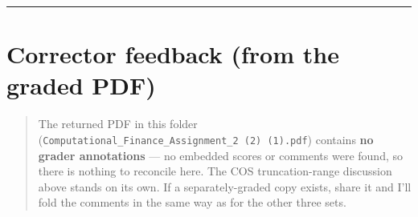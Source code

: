 \documentclass[
  11pt,
]{article}
\begin{document}
\begin{center}\rule{0.5\linewidth}{0.5pt}\end{center}

\hypertarget{corrector-feedback-from-the-graded-pdf}{%
\section{Corrector feedback (from the graded
PDF)}\label{corrector-feedback-from-the-graded-pdf}}

\begin{quote}
The returned PDF in this folder
(\texttt{Computational\_Finance\_Assignment\_2\ (2)\ (1).pdf}) contains
\textbf{no grader annotations} --- no embedded scores or comments were
found, so there is nothing to reconcile here. The COS truncation-range
discussion above stands on its own. If a separately-graded copy exists,
share it and I'll fold the comments in the same way as for the other
three sets.
\end{quote}
\end{document}
